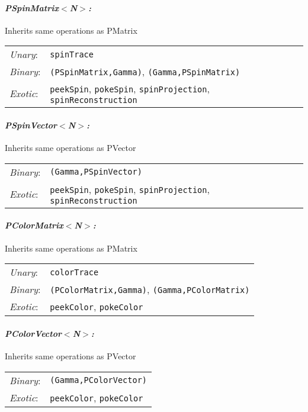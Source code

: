 \documentclass[12pt,letterpaper]{article}
\begin{document}
\paragraph{\bf\em PSpinMatrix$<$N$>$:}
  Inherits same operations as PMatrix
\begin{flushleft}
  \begin{tabular}{lp{5.0in}}
  {\em Unary}:& {\tt spinTrace}\\
  {\em Binary}:& {\tt *(PSpinMatrix,Gamma)}, {\tt *(Gamma,PSpinMatrix)}\\
  {\em Exotic}:& {\tt peekSpin}, {\tt pokeSpin}, {\tt spinProjection}, 
      {\tt spinReconstruction}\\
  \end{tabular}
\end{flushleft}

\paragraph{\bf\em PSpinVector$<$N$>$:}
  Inherits same operations as PVector
\begin{flushleft}
  \begin{tabular}{lp{5.0in}}
  {\em Binary}:& {\tt *(Gamma,PSpinVector)}\\
  {\em Exotic}:& {\tt peekSpin}, {\tt pokeSpin}, {\tt spinProjection}, 
      {\tt spinReconstruction}\\
  \end{tabular}
\end{flushleft}

\paragraph{\bf\em PColorMatrix$<$N$>$:}
  Inherits same operations as PMatrix
\begin{flushleft}
  \begin{tabular}{lp{5.0in}}
  {\em Unary}:& {\tt colorTrace}\\
  {\em Binary}:& {\tt *(PColorMatrix,Gamma)}, {\tt *(Gamma,PColorMatrix)}\\
  {\em Exotic}:& {\tt peekColor}, {\tt pokeColor}\\
  \end{tabular}
\end{flushleft}

\paragraph{\bf\em PColorVector$<$N$>$:}
  Inherits same operations as PVector
\begin{flushleft}
  \begin{tabular}{lp{5.0in}}
  {\em Binary}:& {\tt *(Gamma,PColorVector)}\\
  {\em Exotic}:& {\tt peekColor}, {\tt pokeColor}\\
  \end{tabular}
\end{flushleft}
\end{document}
